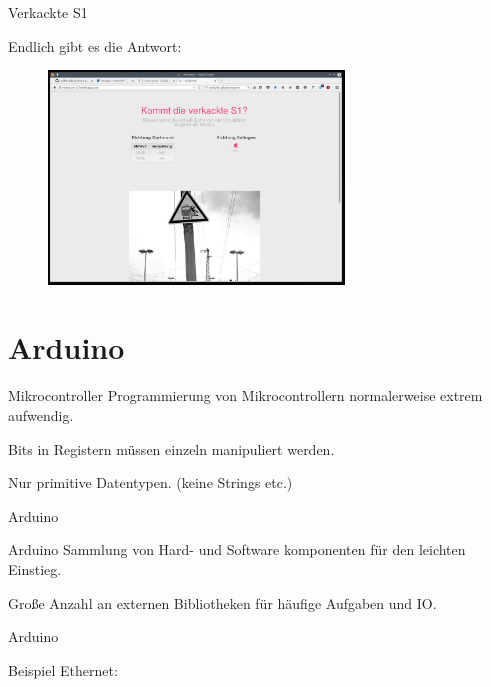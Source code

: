 \documentclass{beamer}
\begin{document}
\begin{frame}[fragile]{Verkackte S1}

  Endlich gibt es die Antwort:

  \begin{figure}[ht]
    \centering
      \includegraphics[width=0.7\textwidth]{pics/screen.jpg}
      \label{fig:screen}
  \end{figure}

\end{frame}

\section{Arduino}
\label{sec:Arduino}

\begin{frame}[fragile]{Mikrocontroller}
  Programmierung von Mikrocontrollern normalerweise extrem aufwendig.

  Bits in Registern müssen einzeln manipuliert werden.

  Nur primitive Datentypen. (keine Strings etc.)
\end{frame}


\begin{frame}[fragile]{Arduino}
\begin{alertblock}{Arduino}
  Sammlung von Hard- und Software komponenten für den leichten Einstieg.

  Große Anzahl an externen Bibliotheken für häufige Aufgaben und IO.
\end{alertblock}
\end{frame}


\begin{frame}[fragile]{Arduino}

\begin{block}{Beispiel Ethernet: }
  
\end{block}

\end{frame}
\end{document}
